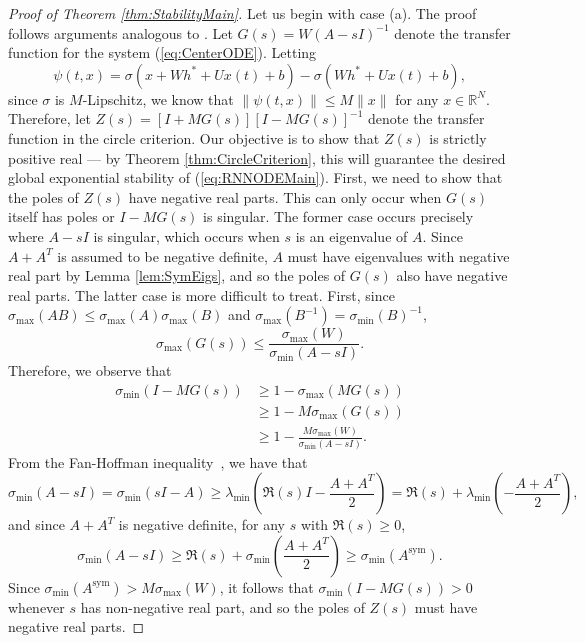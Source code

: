 \documentclass{article} \usepackage{iclr2021_conference,times}
\newcommand{\sym}{\mathrm{sym}}
\begin{document}
\begin{proof}[Proof of Theorem \ref{thm:StabilityMain}]
Let us begin with case (a). The proof follows arguments analogous to \cite[Example 7.1]{khalil2002nonlinear}. Let $G(s) = W(A - sI)^{-1}$ denote the transfer function for the system (\ref{eq:CenterODE}). Letting
\[
\psi(t, x) = \sigma(x + W h^\ast + Ux(t) + b) - \sigma(Wh^\ast + Ux(t)+b),
\]
since $\sigma$ is $M$-Lipschitz, we know that $\|\psi(t, x)\| \leq M \|x\|$ for any $x \in \mathbb{R}^N$. Therefore, let $Z(s) = [I + M G(s)][I - M G(s)]^{-1}$ denote the transfer function in the circle criterion. Our objective is to show that $Z(s)$ is strictly positive real --- by Theorem \ref{thm:CircleCriterion}, this will guarantee the desired global exponential stability of (\ref{eq:RNNODEMain}). First, we need to show that the poles of $Z(s)$ have negative real parts. This can only occur when $G(s)$ itself has poles or $I - M G(s)$ is singular. The former case occurs precisely where $A - sI$ is singular, which occurs when $s$ is an eigenvalue of $A$. Since $A + A^T$ is assumed to be negative definite, $A$ must have eigenvalues with negative real part by Lemma \ref{lem:SymEigs}, and so the poles of $G(s)$ also have negative real parts. The latter case is more difficult to treat. First, since $\sigma_{\max}(AB) \leq \sigma_{\max}(A)\sigma_{\max}(B)$ and $\sigma_{\max}(B^{-1}) = \sigma_{\min}(B)^{-1}$, 
\begin{equation}
\label{eq:TransferSigmaMax}
\sigma_{\max}(G(s)) \leq \frac{\sigma_{\max}(W)}{\sigma_{\min}(A - s I)}.
\end{equation}
Therefore, we observe that
\begin{align*}
\sigma_{\min}(I - M G(s)) &\geq 1 - \sigma_{\max}(M G(s)) \\
&\geq 1 - M \sigma_{\max}(G(s)) \\
&\geq 1 - \frac{M \sigma_{\max}(W)}{\sigma_{\min}(A - sI)}.
\end{align*}
From the Fan-Hoffman inequality~\citep[Proposition III.5.1]{bhatia2013matrix}, we have that
\[
\sigma_{\min}(A - sI) = \sigma_{\min}(s I - A) \geq \lambda_{\min}\left(\Re(s) I - \frac{A+A^T}{2}\right) = \Re(s) + \lambda_{\min}\left(-\frac{A + A^T}{2}\right),
\]
and since $A + A^T$ is negative definite, for any $s$ with $\Re(s) \geq 0$,
\begin{equation}
\sigma_{\min}(A - sI)  \geq \Re(s) + \sigma_{\min}\left(\frac{A+A^T}{2}\right) \geq \sigma_{\min}(A^{\sym}).
\label{eq:SigmaMinImag}
\end{equation}
Since $\sigma_{\min}(A^{\sym}) > M \sigma_{\max}(W)$, it follows that $\sigma_{\min}(I - M G(s)) > 0$ whenever $s$ has non-negative real part, and so the poles of $Z(s)$ must have negative real parts.


\end{proof}
\end{document}

